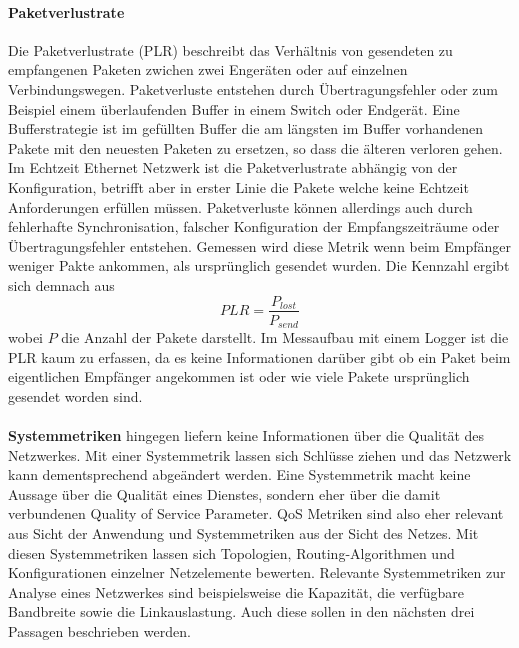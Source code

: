 \documentclass[draft=false
              ,paper=a4
              ,twoside=false
              ,fontsize=11pt
              ,headsepline
              ,BCOR10mm
              ,DIV11
              ]{scrbook}
\begin{document}
\paragraph{Paketverlustrate} %
\label{par:paketverlustrate}
Die Paketverlustrate (PLR) beschreibt das Verhältnis von gesendeten zu empfangenen Paketen zwichen zwei Engeräten oder auf einzelnen Verbindungswegen. Paketverluste entstehen durch Übertragungsfehler oder zum Beispiel einem überlaufenden Buffer in einem Switch oder Endgerät. Eine Bufferstrategie ist im gefüllten Buffer die am längsten im Buffer vorhandenen Pakete mit den neuesten Paketen zu ersetzen, so dass die älteren verloren gehen. Im Echtzeit Ethernet Netzwerk ist die Paketverlustrate abhängig von der Konfiguration, betrifft aber in erster Linie die Pakete welche keine Echtzeit Anforderungen erfüllen müssen. Paketverluste können allerdings auch durch fehlerhafte Synchronisation, falscher Konfiguration der Empfangszeiträume oder Übertragungsfehler entstehen. Gemessen wird diese Metrik wenn beim Empfänger weniger Pakte ankommen, als ursprünglich gesendet wurden. Die Kennzahl ergibt sich demnach aus 
\begin{equation}
  PLR = \frac{P_{lost}}{P_{send}}
\end{equation}
wobei $P$ die Anzahl der Pakete darstellt. Im Messaufbau mit einem Logger ist die PLR kaum zu erfassen, da es keine Informationen darüber gibt ob ein Paket beim eigentlichen Empfänger angekommen ist oder wie viele Pakete ursprünglich gesendet worden sind. 

\paragraph{} %

\textbf{Systemmetriken} hingegen liefern keine Informationen über die Qualität des Netzwerkes. Mit einer Systemmetrik lassen sich Schlüsse ziehen und das Netzwerk kann dementsprechend abgeändert werden. Eine Systemmetrik macht keine Aussage über die Qualität eines Dienstes, sondern eher über die damit verbundenen Quality of Service Parameter. QoS Metriken sind also eher relevant aus Sicht der Anwendung und Systemmetriken aus der Sicht des Netzes. Mit diesen Systemmetriken lassen sich Topologien, Routing-Algorithmen und Konfigurationen einzelner Netzelemente bewerten. Relevante Systemmetriken zur Analyse eines Netzwerkes sind beispielsweise die Kapazität, die verfügbare Bandbreite sowie die Linkauslastung. Auch diese sollen in den nächsten drei Passagen beschrieben werden. 
\end{document}
